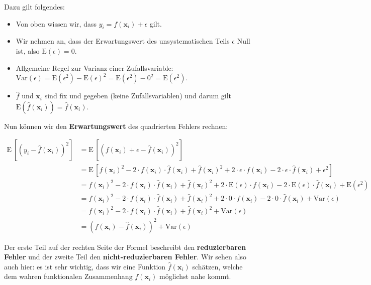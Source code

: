 \documentclass[
]{book}
\providecommand{\tightlist}{%
  \setlength{\itemsep}{0pt}\setlength{\parskip}{0pt}}
\begin{document}
Dazu gilt folgendes:

\begin{itemize}
\tightlist
\item
  Von oben wissen wir, dass \(y_i = f(\mathbf{x}_i) + \epsilon\) gilt.
\item
  Wir nehmen an, dass der Erwartungswert des unsystematischen Teils \(\epsilon\) Null ist, also \(\text{E}(\epsilon)=0\).
\item
  Allgemeine Regel zur Varianz einer Zufallsvariable: \(\text{Var}(\epsilon) = \text{E}(\epsilon^2) - \text{E}(\epsilon)^2 = \text{E}(\epsilon^2) - 0^2 = \text{E}(\epsilon^2)\).
\item
  \(\hat{f}\) und \(\mathbf{x}_i\) sind fix und gegeben (keine Zufallsvariablen) und darum gilt \(\text{E}\left(\hat{f}(\mathbf{x}_i)\right)=\hat{f}(\mathbf{x}_i)\).
\end{itemize}

Nun können wir den \textbf{Erwartungswert} des quadrierten Fehlers rechnen:

\begin{align}
\text{E}\,\left[\left(y_i - \hat{f}(\mathbf{x}_i)\right)^2\right] &= \text{E}\,\left[\left(f(\mathbf{x}_i) + \epsilon - \hat{f}(\mathbf{x}_i)\right)^2\right] \\
&= \text{E}\,\left[f(\mathbf{x}_i)^2 - 2 \cdot f(\mathbf{x}_i) \cdot \hat{f}(\mathbf{x}_i) + \hat{f}(\mathbf{x}_i)^2 + 2 \cdot \epsilon \cdot f(\mathbf{x}_i) - 2 \cdot \epsilon \cdot \hat{f}(\mathbf{x}_i) + \epsilon^2 \right] \\
&= f(\mathbf{x}_i)^2 - 2 \cdot f(\mathbf{x}_i) \cdot \hat{f}(\mathbf{x}_i) + \hat{f}(\mathbf{x}_i)^2 + 2 \cdot \text{E}(\epsilon) \cdot f(\mathbf{x}_i) - 2 \cdot \text{E}(\epsilon) \cdot \hat{f}(\mathbf{x}_i) + \text{E}(\epsilon^2) \\
&= f(\mathbf{x}_i)^2 - 2 \cdot f(\mathbf{x}_i) \cdot \hat{f}(\mathbf{x}_i) + \hat{f}(\mathbf{x}_i)^2 + 2 \cdot 0 \cdot f(\mathbf{x}_i) - 2 \cdot 0 \cdot \hat{f}(\mathbf{x}_i) + \text{Var}(\epsilon) \\
&= f(\mathbf{x}_i)^2 - 2 \cdot f(\mathbf{x}_i) \cdot \hat{f}(\mathbf{x}_i) + \hat{f}(\mathbf{x}_i)^2 + \text{Var}(\epsilon) \\
&= \left(f(\mathbf{x}_i) - \hat{f}(\mathbf{x}_i)\right)^2 + \text{Var}(\epsilon)
\end{align}

Der erste Teil auf der rechten Seite der Formel beschreibt den \textbf{reduzierbaren Fehler} und der zweite Teil den \textbf{nicht-reduzierbaren Fehler}. Wir sehen also auch hier: es ist sehr wichtig, dass wir eine Funktion \(\hat{f}(\mathbf{x}_i)\) schätzen, welche dem wahren funktionalen Zusammenhang \(f(\mathbf{x}_i)\) möglichst nahe kommt.
\end{document}
